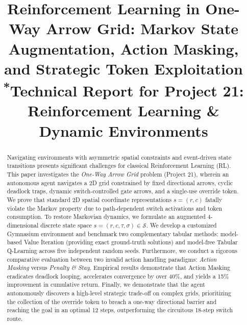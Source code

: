 \documentclass[conference]{IEEEtran}
\begin{document}
\title{Reinforcement Learning in One-Way Arrow Grid: Markov State Augmentation, Action Masking, and Strategic Token Exploitation\\
{\footnotesize \textsuperscript{*}Technical Report for Project 21: Reinforcement Learning & Dynamic Environments}
}

\author{
}

\maketitle

\begin{abstract}
Navigating environments with asymmetric spatial constraints and event-driven state transitions presents significant challenges for classical Reinforcement Learning (RL). This paper investigates the \textit{One-Way Arrow Grid} problem (Project 21), wherein an autonomous agent navigates a 2D grid constrained by fixed directional arrows, cyclic deadlock traps, dynamic switch-controlled gate arrows, and a single-use override token. We prove that standard 2D spatial coordinate representations $s = (r, c)$ fatally violate the Markov property due to path-dependent switch activations and token consumption. To restore Markovian dynamics, we formulate an augmented 4-dimensional discrete state space $s = (r, c, \tau, \sigma) \in \mathcal{S}$. We develop a customized Gymnasium environment and benchmark two complementary tabular methods: model-based Value Iteration (providing exact ground-truth solutions) and model-free Tabular Q-Learning across five independent random seeds. Furthermore, we conduct a rigorous comparative evaluation between two invalid action handling paradigms: \textit{Action Masking} versus \textit{Penalty \& Stay}. Empirical results demonstrate that Action Masking eradicates deadlock looping, accelerates convergence by over 40\%, and yields a 15\% improvement in cumulative return. Finally, we demonstrate that the agent autonomously discovers a high-level strategic trade-off on complex grids, prioritizing the collection of the override token to breach a one-way directional barrier and reaching the goal in an optimal 12 steps, outperforming the circuitous 18-step switch route.
\end{abstract}
\end{document}
